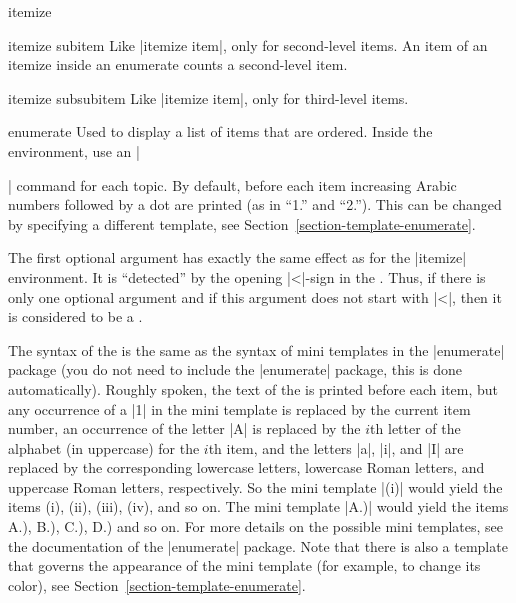 \begin{environment}{{itemize}}
  \begin{template}{itemize subitem}
    Like |itemize item|, only for second-level items. An
    item of an itemize inside an enumerate counts a second-level item.
  \end{template}

  \begin{template}{itemize subsubitem}
    Like |itemize item|, only for third-level items.
  \end{template}
\end{environment}



\begin{environment}{{enumerate}} 
  Used to display a list of items that are ordered.  Inside the
  environment, use an |\item| command for each topic. By default,
  before each item increasing Arabic numbers  followed by a dot are
  printed (as in ``1.'' and ``2.''). This can be changed by specifying
  a different template,  see
  Section~\ref{section-template-enumerate}.

  The first optional argument  has
  exactly the same effect as for the |itemize| environment. It is
  ``detected'' by the opening |<|-sign in the . Thus, if there is only one optional argument and
  if this argument does not start with |<|, then it is considered to
  be a . 

  The syntax of the  is the same as
  the syntax of mini templates in the |enumerate| package (you do not
  need to include the 
  |enumerate| package, this is done automatically). Roughly spoken,
  the text of the  is printed before each item,
  but any occurrence of a |1| in the mini template is replaced by the
  current item number, an occurrence of the letter |A| is replaced by
  the $i$th letter of the alphabet (in uppercase) for the $i$th item,
  and the letters |a|, |i|, and |I| are replaced by the corresponding
  lowercase letters, lowercase Roman letters, and uppercase Roman
  letters, respectively. So the mini template |(i)| would yield the
  items (i), (ii), (iii), (iv), and so on. The mini template |A.)|
  would yield the items A.), B.), C.), D.) and so on. For more details
  on the possible mini templates, see the documentation of the
  |enumerate| package. Note that there is also a template that governs
  the appearance of the mini template (for example, to change its
  color), see Section~\ref{section-template-enumerate}.
  

\end{environment}
